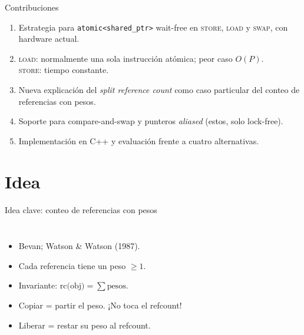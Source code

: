 \documentclass[aspectratio=169,11pt,xcolor=table]{beamer}
\begin{document}
\begin{frame}{Contribuciones}
  \begin{enumerate}
    \item Estrategia para \texttt{atomic<shared\_ptr>} \alert{wait-free} en \textsc{store}, \textsc{load} y \textsc{swap}, con hardware actual.
    \item \textsc{load}: normalmente \alert{una sola instrucción atómica}; peor caso $O(P)$.\\
              \textsc{store}: tiempo constante.
    \item Nueva explicación del \emph{split reference count} como caso particular del \alert{conteo de referencias con pesos}.
    \item Soporte para compare-and-swap y punteros \emph{aliased} (estos, solo lock-free).
    \item Implementación en C++ y evaluación frente a cuatro alternativas.
  \end{enumerate}
\end{frame}

\section{Idea}
\begin{frame}{Idea clave: conteo de referencias con pesos}
  \begin{columns}[c]
    \begin{itemize}
      \item Bevan; Watson \& Watson (1987).
      \item Cada referencia tiene un \alert{peso} $\geq 1$.
      \item Invariante: $\text{rc(obj)} = \sum \text{pesos}$.
      \item \alert{Copiar} = partir el peso. ¡No toca el refcount!
      \item Liberar = restar su peso al refcount.
    \end{itemize}
    \centering
  \end{columns}
\end{frame}
\end{document}
